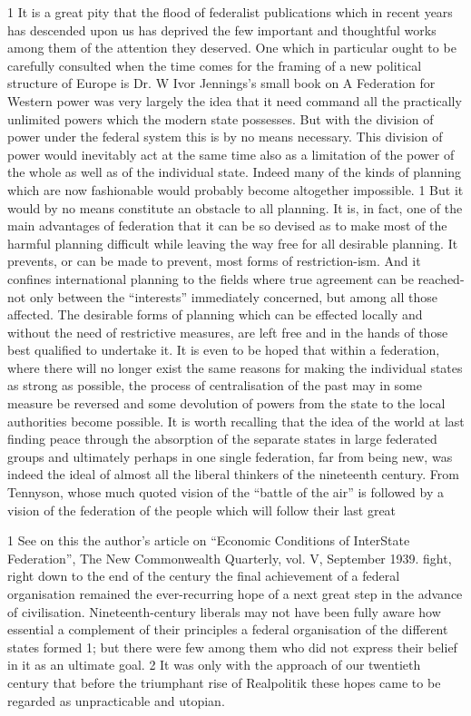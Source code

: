 \documentclass[11pt,openany]{book}
\begin{document}
1 It is a great pity that the flood of federalist publications which in recent years has descended upon us has deprived the few important and thoughtful works among them of the attention they deserved. One which in particular ought to be carefully consulted when the time comes for the framing of a new political structure of Europe is Dr. W Ivor Jennings's small book on A Federation for Western power was very largely the idea that it need command all the practically unlimited powers which the modern state possesses. But with the division of power under the federal system this is by no means necessary. This division of power would inevitably act at the same time also as a limitation of the power of the whole as well as of the individual state. Indeed many of the kinds of planning which are now fashionable would probably become altogether impossible. 1 But it would by no means constitute an obstacle to all planning. It is, in fact, one of the main advantages of federation that it can be so devised as to make most of the harmful planning difficult while leaving the way free for all desirable planning. It prevents, or can be made to prevent, most forms of restriction-ism. And it confines international planning to the fields where true agreement can be reached-not only between the ``interests'' immediately concerned, but among all those affected. The desirable forms of planning which can be effected locally and without the need of restrictive measures, are left free and in the hands of those best qualified to undertake it. It is even to be hoped that within a federation, where there will no longer exist the same reasons for making the individual states as strong as possible, the process of centralisation of the past may in some measure be reversed and some devolution of powers from the state to the local authorities become possible. It is worth recalling that the idea of the world at last finding peace through the absorption of the separate states in large federated groups and ultimately perhaps in one single federation, far from being new, was indeed the ideal of almost all the liberal thinkers of the nineteenth century. From Tennyson, whose much quoted vision of the ``battle of the air'' is followed by a vision of the federation of the people which will follow their last great

1 See on this the author's article on ``Economic Conditions of InterState Federation'', The New Commonwealth Quarterly, vol. V, September 1939. fight, right down to the end of the century the final achievement of a federal organisation remained the ever-recurring hope of a next great step in the advance of civilisation. Nineteenth-century liberals may not have been fully aware how essential a complement of their principles a federal organisation of the different states formed 1; but there were few among them who did not express their belief in it as an ultimate goal. 2 It was only with the approach of our twentieth century that before the triumphant rise of Realpolitik these hopes came to be regarded as unpracticable and utopian.
\end{document}
